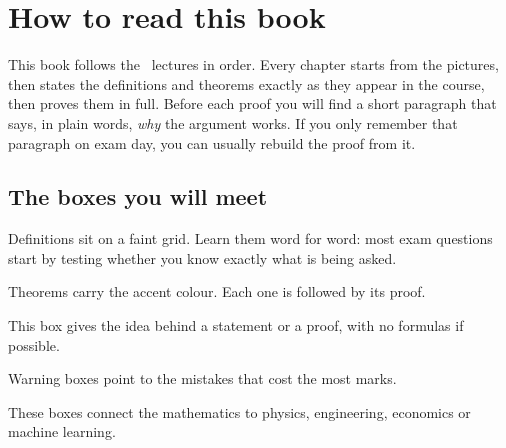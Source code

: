 \chapter*{How to read this book}

This book follows the \coursecode\ lectures in order. Every chapter starts from the
pictures, then states the definitions and theorems exactly as they appear in the course,
then proves them in full. Before each proof you will find a short paragraph that says,
in plain words, \emph{why} the argument works. If you only remember that paragraph on exam
day, you can usually rebuild the proof from it.

\section*{The boxes you will meet}

\begin{tcolorbox}[corners=primary,colback=primarytint,bpgridbg=primarygrid!70,title=Definition]
Definitions sit on a faint grid. Learn them word for word: most exam
questions start by testing whether you know exactly what is being asked.
\end{tcolorbox}

\begin{tcolorbox}[corners=accent,colback=accenttint,bpgridbg=accent!10,title=Theorem]
Theorems carry the accent colour. Each one is followed by its proof.
\end{tcolorbox}

\begin{intuition}
This box gives the idea behind a statement or a proof, with no formulas if possible.
\end{intuition}

\begin{trap}
Warning boxes point to the mistakes that cost the most marks.
\end{trap}

\begin{reallife}{}
These boxes connect the mathematics to physics, engineering, economics or machine learning.
\end{reallife}

